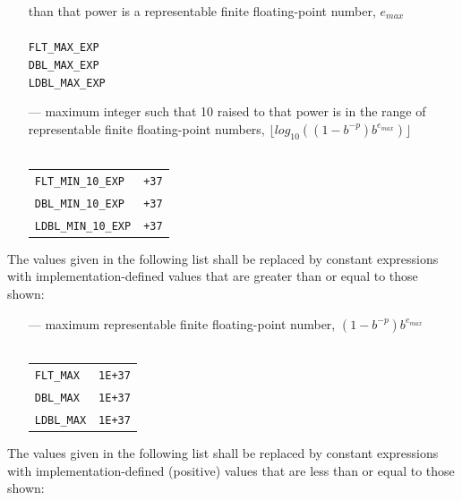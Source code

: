\begin{itemize}
  than that power is a representable finite floating-point number,
  $e_{max}$\\\\
\texttt{FLT\_MAX\_EXP}\\
\texttt{DBL\_MAX\_EXP}\\
\texttt{LDBL\_MAX\_EXP}\\
\item[---] maximum integer such that 10 raised to that power is in the range of
  representable finite floating-point numbers, $\lfloor log_{10}((1 -
  b^{-p})b^{e_{max}} )\rfloor$\\\\
\begin{tabular}{lr}
\texttt{FLT\_MIN\_10\_EXP}&\hfil\hspace*{2cm}\texttt{+37}\\
\texttt{DBL\_MIN\_10\_EXP}&\hfil\hspace*{2cm}\texttt{+37}\\
\texttt{LDBL\_MIN\_10\_EXP}&\hfil\hspace*{2cm}\texttt{+37}
\end{tabular}
\end{itemize}

The values given in the following list shall be replaced by constant
expressions with implementation-defined values that are greater than or equal
to those shown:

\begin{itemize}
\item[---] maximum representable finite floating-point number, $(1 -
  b^{-p})b^{e_{max}}$\\\\
\begin{tabular}{lr}
\texttt{FLT\_MAX}&\hfil\hspace*{2cm}\texttt{1E+37}\\
\texttt{DBL\_MAX}&\hfil\hspace*{2cm}\texttt{1E+37}\\
\texttt{LDBL\_MAX}&\hfil\hspace*{2cm}\texttt{1E+37}
\end{tabular}
\end{itemize}

The values given in the following list shall be replaced by constant
expressions with implementation-defined (positive) values that are less than or
equal to those shown:

